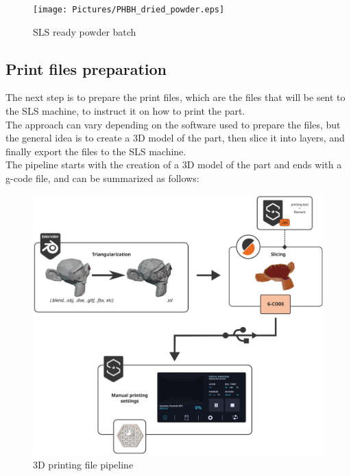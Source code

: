 \documentclass{article}
\begin{document}
                \begin{figure}[h!]
                    \centering
                    \texttt{[image: Pictures/PHBH\_dried\_powder.eps]}
                    \caption{SLS ready powder batch}
                    \label{fig:PHBH_collected_powder}
                    
                \end{figure}

        \subsection{Print files preparation\label{Print_files_preparation}}

        The next step is to prepare the print files, which are the files that will be sent to the SLS machine, 
        to instruct it on how to print the part. \\

        The approach can vary depending on the software used to prepare the files, but the general idea is to 
        create a 3D model of the part, then slice it into layers, and finally export the files to the SLS machine. \\

        The pipeline starts with the creation of a 3D model of the part and ends with a g-code file, and can 
        be summarized as follows: 
        
                \begin{figure}[h!]
                    \centering 
                    \includegraphics[width=\textwidth]{Pictures/3dprint_file_pipeline_scheme.eps}
                    \caption{3D printing file pipeline}
                    \label{fig:3dprint_file_pipeline_scheme}
                \end{figure}
\end{document}
